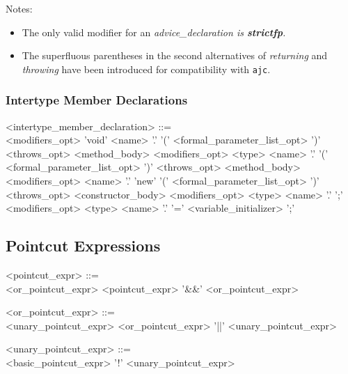 \noindent Notes:
\begin{itemize}
\item The only valid modifier for an \em{advice\_declaration} is 
{\bf strictfp}.
\item The superfluous parentheses in the second alternatives of
{\it returning} and {\it throwing} have been introduced for compatibility with {\tt ajc}. 
\end{itemize}

\subsubsection{Intertype Member Declarations}

\begin{minipage}{6in}
\begin{blue}
\begin{grammar}
<intertype_member_declaration> ::= \hspace{1in} \\
     {\red <modifiers_opt>} 'void' {\red <name>} '.' {}
     '(' {\red <formal_parameter_list_opt>} ')' {\red <throws_opt>}
     {\red <method_body>}
\alt 
     {\red <modifiers_opt>} {\red <type>} {\red <name>} '.' {}
     '(' {\red <formal_parameter_list_opt>} ')' {\red <throws_opt>}
     {\red <method_body>}
\alt 
     {\red <modifiers_opt>} {\red <name>} '.' 'new' 
     '(' {\red <formal_parameter_list_opt>} ')' {\red <throws_opt>}
     {\red <constructor_body>}
\alt
     {\red <modifiers_opt>} {\red <type>} {\red <name>} '.' 
     {} ';'
\alt
     {\red <modifiers_opt>} {\red <type>} {\red <name>} '.' 
     {} '=' {\red <variable_initializer>} ';'
\end{grammar}
\end{blue}
\end{minipage}
 
 
\subsection{Pointcut Expressions}

\begin{minipage}{6in}
\begin{grammar}
\begin{blue}
<pointcut_expr> ::= \hspace{1in} \\
       <or_pointcut_expr> 
\alt   <pointcut_expr> '\&\&' <or_pointcut_expr>

<or_pointcut_expr> ::= \hspace{1in} \\
       <unary_pointcut_expr> 
\alt   <or_pointcut_expr> '||' <unary_pointcut_expr>

<unary_pointcut_expr> ::= \hspace{1in} \\
       <basic_pointcut_expr> 
\alt   '!' <unary_pointcut_expr>
\end{blue}
\end{grammar}
\end{minipage}

